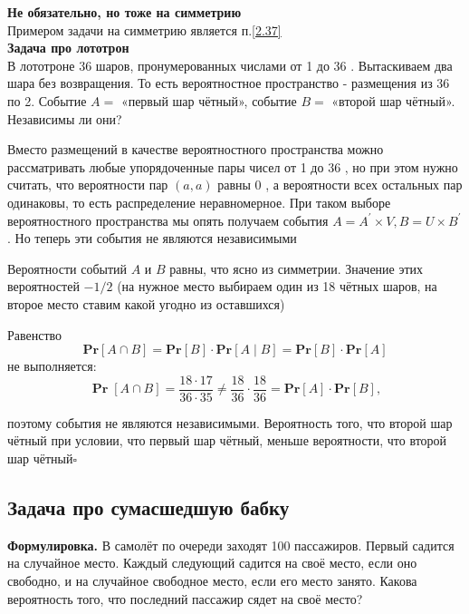 \documentclass[a4paper]{article}
\newcommand{\qed}{\hfill$\square$}
\begin{document}
\textbf{Не обязательно, но тоже на симметрию}\\
Примером задачи на симметрию является п.\ref{2.37}\\[2mm]
\indent\textbf{Задача про лототрон}\\
В лототроне 36 шаров, пронумерованных числами от 1 до 36 . Вытаскиваем два шара без возвращения. То есть вероятностное пространство - размещения из 36 по 2. Событие $A=$ «первый шар чётный», событие $B=$ «второй шар чётный». Независимы ли они?

Вместо размещений в качестве вероятностного пространства можно рассматривать любые упорядоченные пары чисел от 1 до 36 , но при этом нужно считать, что вероятности пар $(a, a)$ равны 0 , а вероятности всех остальных пар одинаковы, то есть распределение неравномерное. При таком выборе вероятностного пространства мы опять получаем события $A=A^{\prime} \times V, B=U \times B^{\prime}$. Но теперь эти события не являются независимыми

Вероятности событий $A$ и $B$ равны, что ясно из симметрии. Значение этих вероятностей $-1 / 2$ (на нужное место выбираем один из 18 чётных шаров, на второе место ставим какой угодно из оставшихся)

Равенство $$\textbf{Pr}[A \cap B]=\textbf{Pr}[B] \cdot \textbf{Pr}[A \mid B]=\textbf{Pr}[B] \cdot \textbf{Pr}[A]$$ не выполняется:
$$
\boldsymbol{\operatorname { P r }}[A \cap B]=\frac{18 \cdot 17}{36 \cdot 35} \neq \frac{18}{36} \cdot \frac{18}{36}=\textbf{Pr}[A] \cdot \textbf{Pr}[B],
$$

поэтому события не являются независимыми. Вероятность того, что второй шар чётный при условии, что первый шар чётный, меньше вероятности, что второй шар чётный\qed


\subsection{Задача про сумасшедшую бабку}
\textbf{Формулировка.} В самолёт по очереди заходят 100 пассажиров. Первый садится на случайное место. Каждый следующий садится на своё место, если оно свободно, и на случайное свободное место, если его место занято. Какова вероятность того, что последний пассажир сядет на своё место?
\end{document}
